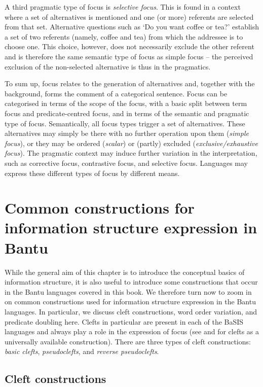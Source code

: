 \documentclass[output=paper]{langscibook}
\begin{document}
A third pragmatic type of focus is \textit{selective focus}. This is found in a context where a set of alternatives is mentioned and one (or more) referents are selected from that set. Alternative questions such as ‘Do you want coffee or tea?’ establish a set of two referents (namely, coffee and tea) from which the addressee is to choose one. This choice, however, does not necessarily exclude the other referent and is therefore the same semantic type of focus as simple focus – the perceived exclusion of the non-selected alternative is thus in the pragmatics. 

To sum up, focus relates to the generation of alternatives and, together with the background, forms the comment of a categorical sentence. Focus can be categorised in terms of the scope of the focus, with a basic split between term focus and predicate-centred focus, and in terms of the semantic and pragmatic type of focus. Semantically, all focus types trigger a set of alternatives. These alternatives may simply be there with no further operation upon them (\textit{simple focus}), or they may be ordered (\textit{scalar}) or (partly) excluded (\textit{exclusive/exhaustive focus}). The pragmatic context may induce further variation in the interpretation, such as corrective focus, contrastive focus, and selective focus. Languages may express these different types of focus by different means.

\section{Common constructions for information structure expression in Bantu}
\label{common}

While the general aim of this chapter is to introduce the conceptual basics of information structure, it is also useful to introduce some constructions that occur in the Bantu languages covered in this book. We therefore turn now to zoom in on common constructions used for information structure expression in the Bantu languages. In particular, we discuss cleft constructions, word order variation, and predicate doubling here. Clefts in particular are present in each of the BaSIS languages and always play a role in the expression of focus (see \citealt{Gundel1988} and \citealt{Creisels2020} for clefts as a universally available construction). There are three types of cleft constructions: \textit{basic clefts}, \textit{pseudoclefts}, and \textit{reverse pseudoclefts}.

\subsection{Cleft constructions}
\end{document}
